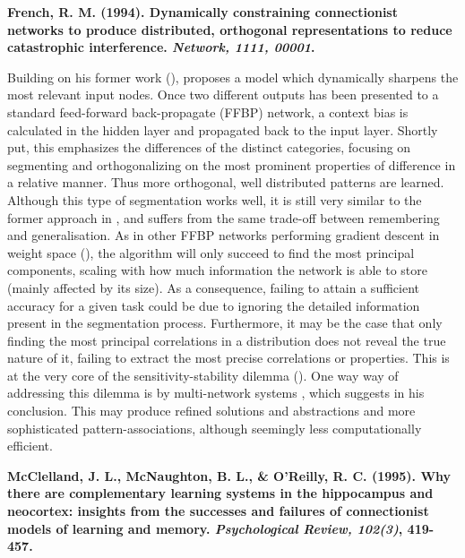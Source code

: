 \textbf{French, R. M. (1994). Dynamically constraining connectionist networks to produce distributed, orthogonal representations to reduce catastrophic interference.\textit{ Network, 1111, 00001}.}

Building on his former work (\cite{French1992}), \cite{French1994} proposes a model which dynamically sharpens the most relevant input nodes. Once two different outputs has been presented to a standard feed-forward back-propagate (FFBP) network, a context bias is calculated in the hidden layer and propagated back to the input layer. Shortly put, this emphasizes the differences of the distinct categories, focusing on segmenting and orthogonalizing on the most prominent properties of difference in a relative manner. Thus more orthogonal, well distributed patterns are learned.
Although this type of segmentation works well, it is still very similar to the former approach in \cite{French1992}, and suffers from the same trade-off between remembering and generalisation. As in other FFBP networks performing gradient descent in weight space (\cite{Hinton1989}), the algorithm will only succeed to find the most principal components, scaling with how much information the network is able to store (mainly affected by its size). As a consequence, failing to attain a sufficient accuracy for a given task could be due to ignoring the detailed information present in the segmentation process. Furthermore, it may be the case that only finding the most principal correlations in a distribution does not reveal the true nature of it, failing to extract the most precise correlations or properties. This is at the very core of the sensitivity-stability dilemma (\cite{Hebb1949}). One way way of addressing this dilemma is by multi-network systems , which \cite{French1994} suggests in his conclusion. This may produce refined solutions and abstractions and more sophisticated pattern-associations, although seemingly less computationally efficient.


\textbf{McClelland, J. L., McNaughton, B. L., \& O’Reilly, R. C. (1995). Why there are complementary learning systems in the hippocampus and neocortex: insights from the successes and failures of connectionist models of learning and memory. \textit{Psychological Review, 102(3)}, 419-457.}


